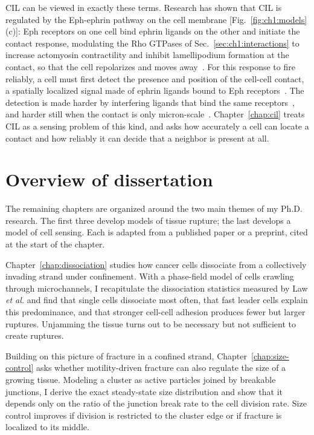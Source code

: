 CIL can be viewed in exactly these terms.
Research has shown that CIL is regulated by the Eph-ephrin pathway on the cell membrane [Fig.~\ref{fig:ch1:models}(c)]: Eph receptors on one cell bind ephrin ligands on the other and initiate the contact response, modulating the Rho GTPases of Sec.~\ref{sec:ch1:interactions} to increase actomyosin contractility and inhibit lamellipodium formation at the contact, so that the cell repolarizes and moves away~\cite{klein2012eph, noren2004eph, pasquale2008eph, arvanitis2008eph}.
For this response to fire reliably, a cell must first detect the presence and position of the cell-cell contact, a spatially localized signal made of ephrin ligands bound to Eph receptors~\cite{larranaga2022ephrin, lin2015interplay}.
The detection is made harder by interfering ligands that bind the same receptors~\cite{wykosky2008soluble, gong2016exosomes, minami2011ephrina}, and harder still when the contact is only micron-scale~\cite{singh2021rules}.
Chapter~\ref{chap:cil} treats CIL as a sensing problem of this kind, and asks how accurately a cell can locate a contact and how reliably it can decide that a neighbor is present at all.


\section{Overview of dissertation}
\label{sec:ch1:overview}

The remaining chapters are organized around the two main themes of my Ph.D. research.
The first three develop models of tissue rupture; the last develops a model of cell sensing.
Each is adapted from a published paper or a preprint, cited at the start of the chapter.

Chapter~\ref{chap:dissociation} studies how cancer cells dissociate from a collectively invading strand under confinement.
With a phase-field model of cells crawling through microchannels, I recapitulate the dissociation statistics measured by Law \textit{et al.} and find that single cells dissociate most often, that fast leader cells explain this predominance, and that stronger cell-cell adhesion produces fewer but larger ruptures.
Unjamming the tissue turns out to be necessary but not sufficient to create ruptures.

Building on this picture of fracture in a confined strand, Chapter~\ref{chap:size-control} asks whether motility-driven fracture can also regulate the size of a growing tissue.
Modeling a cluster as active particles joined by breakable junctions, I derive the exact steady-state size distribution and show that it depends only on the ratio of the junction break rate to the cell division rate.
Size control improves if division is restricted to the cluster edge or if fracture is localized to its middle.

